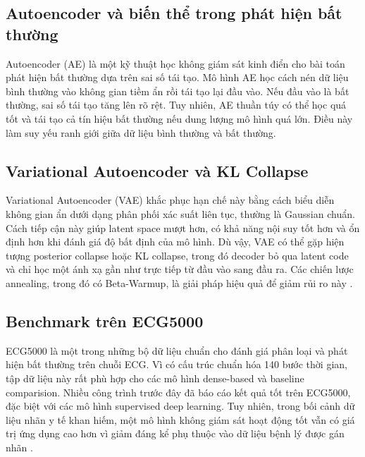 \documentclass[conference]{IEEEtran}
\begin{document}
\subsection{Autoencoder và biến thể trong phát hiện bất thường}
Autoencoder (AE) là một kỹ thuật học không giám sát kinh điển cho bài toán phát hiện bất thường dựa trên sai số tái tạo. Mô hình AE học cách nén dữ liệu bình thường vào không gian tiềm ẩn rồi tái tạo lại đầu vào. Nếu đầu vào là bất thường, sai số tái tạo tăng lên rõ rệt. Tuy nhiên, AE thuần túy có thể học quá tốt và tái tạo cả tín hiệu bất thường nếu dung lượng mô hình quá lớn. Điều này làm suy yếu ranh giới giữa dữ liệu bình thường và bất thường.

\subsection{Variational Autoencoder và KL Collapse}
Variational Autoencoder (VAE) khắc phục hạn chế này bằng cách biểu diễn không gian ẩn dưới dạng phân phối xác suất liên tục, thường là Gaussian chuẩn. Cách tiếp cận này giúp latent space mượt hơn, có khả năng nội suy tốt hơn và ổn định hơn khi đánh giá độ bất định của mô hình. Dù vậy, VAE có thể gặp hiện tượng posterior collapse hoặc KL collapse, trong đó decoder bỏ qua latent code và chỉ học một ánh xạ gần như trực tiếp từ đầu vào sang đầu ra. Các chiến lược annealing, trong đó có Beta-Warmup, là giải pháp hiệu quả để giảm rủi ro này \cite{bowman,beta_vae}.

\subsection{Benchmark trên ECG5000}
ECG5000 là một trong những bộ dữ liệu chuẩn cho đánh giá phân loại và phát hiện bất thường trên chuỗi ECG. Vì có cấu trúc chuẩn hóa 140 bước thời gian, tập dữ liệu này rất phù hợp cho các mô hình dense-based và baseline comparision. Nhiều công trình trước đây đã báo cáo kết quả tốt trên ECG5000, đặc biệt với các mô hình supervised deep learning. Tuy nhiên, trong bối cảnh dữ liệu nhãn y tế khan hiếm, một mô hình không giám sát hoạt động tốt vẫn có giá trị ứng dụng cao hơn vì giảm đáng kể phụ thuộc vào dữ liệu bệnh lý được gán nhãn \cite{ucr,chen,thill}.
\end{document}
